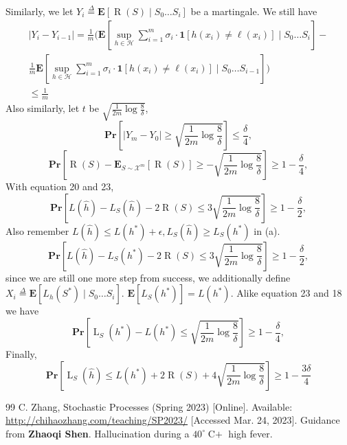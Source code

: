 \documentclass{article}
\theoremstyle{definition}
\begin{document}
\begin{enumerate}[(a)]
 		Similarly, we let $Y_i \overset{\Delta}{=} \mathbf E[\operatorname{R}(S)\mid S_0\dots S_i]$ be a martingale. 
 		We still have
 		\begin{equation}
 			\begin{aligned}
	 			|Y_i-Y_{i-1}| = \frac{1}{m}(\mathbf E[{\sup_{h\in\mathcal H}\sum_{i=1}^m\sigma_i\cdot\mathbf 1[h(x_i)\ne \ell(x_i)]}\mid S_0\dots S_i]-\\
	 			\frac{1}{m}\mathbf E[{\sup_{h\in\mathcal H}\sum_{i=1}^m\sigma_i\cdot\mathbf 1[h(x_i)\ne \ell(x_i)]}\mid S_0\dots S_{i-1}])\\
	 			\leq \frac{1}{m}
			\end{aligned}
 		\end{equation}
 		Also similarly, let $t$ be $\sqrt{\frac{1}{2m}\log\frac{8}{\delta}}$, 
 		\begin{equation}
 			\mathbf{Pr}[|Y_m-Y_0|\geq \sqrt{\frac{1}{2m}\log\frac{8}{\delta}}] \leq \frac{\delta}{4}, 
 		\end{equation}
 	 	\begin{equation}
	 		\mathbf{Pr}[\operatorname R(S)-\mathbf E_{S\sim \mathcal X^m}[\operatorname{R}(S)]\geq -\sqrt{\frac{1}{2m}\log\frac{8}{\delta}}] \geq 1-\frac{\delta}{4}, 
	 	\end{equation}
 		With equation 20 and 23, 
 		 \begin{equation}
 			\mathbf{Pr}[L(\widehat h)-L_S(\widehat h)-2\operatorname R(S)\leq 3\sqrt{\frac{1}{2m}\log\frac{8}{\delta}}] \geq 1-\frac{\delta}{2}, 
 		\end{equation}
 		Also remember $L(\widehat h)\leq L(h^*) + \epsilon, L_S(\widehat h)\geq L_S(h^*)$ in (a). 
 		\begin{equation}
 			\mathbf{Pr}[L(\widehat h)-L_S(h^*)-2\operatorname R(S)\leq 3\sqrt{\frac{1}{2m}\log\frac{8}{\delta}}] \geq 1-\frac{\delta}{2}, 
 		\end{equation}
 		since we are still one more step from success, we additionally define $X_i \overset{\Delta}{=} \mathbf E[L_h(S^*)\mid S_0\dots S_i]$.
 		$\mathbf E[L_S(h^*)] = L(h^*)$. Alike equation 23 and 18 we have 
  	 	\begin{equation}
 			\mathbf{Pr}[\operatorname L_S(h^*)-L(h^*)\leq \sqrt{\frac{1}{2m}\log\frac{8}{\delta}}] \geq 1-\frac{\delta}{4}, 
 		\end{equation}
 		Finally,
 		\begin{equation}
 			\mathbf{Pr}[\operatorname L_S(\widehat h)\leq L(h^*) + 2\operatorname R(S) + 4\sqrt{\frac{1}{2m}\log\frac{8}{\delta}}] \geq 1-\frac{3\delta}{4}
 		\end{equation}
 	
	\end{enumerate}

	\begin{thebibliography}{99}
		 C. Zhang, Stochastic Processes (Spring 2023) [Online]. Available: \url{http://chihaozhang.com/teaching/SP2023/} [Accessed Mar. 24, 2023].
		 Guidance from \textbf{Zhaoqi Shen}. 
		 Hallucination during a $40^\circ\operatorname{C+}$ high fever. 
	\end{thebibliography}
\end{document}
